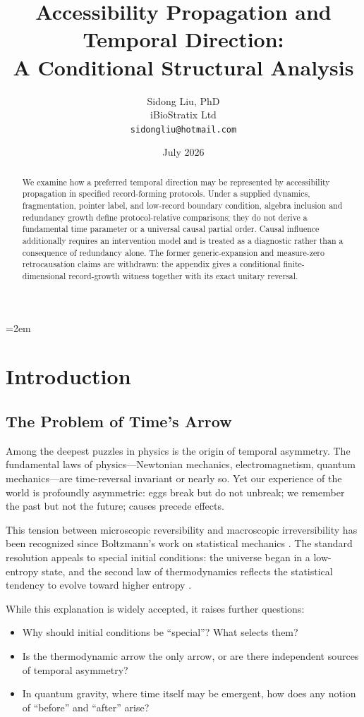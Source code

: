 \documentclass[12pt,a4paper]{article}
\title{Accessibility Propagation and Temporal Direction:\\
A Conditional Structural Analysis}
\author{
  Sidong Liu, PhD \\
  iBioStratix Ltd \\
  \texttt{sidongliu@hotmail.com}
}
\date{July 2026}
\begin{document}
\emergencystretch=2em
\raggedbottom
{}

\maketitle

\begin{abstract}
We examine how a preferred temporal direction may be represented by accessibility propagation in specified record-forming protocols. Under a supplied dynamics, fragmentation, pointer label, and low-record boundary condition, algebra inclusion and redundancy growth define protocol-relative comparisons; they do not derive a fundamental time parameter or a universal causal partial order. Causal influence additionally requires an intervention model and is treated as a diagnostic rather than a consequence of redundancy alone. The former generic-expansion and measure-zero retrocausation claims are withdrawn: the appendix gives a conditional finite-dimensional record-growth witness together with its exact unitary reversal.
\end{abstract}

\section{Introduction}
\label{sec:intro}

\subsection{The Problem of Time's Arrow}

Among the deepest puzzles in physics is the origin of temporal asymmetry. The fundamental laws of physics---Newtonian mechanics, electromagnetism, quantum mechanics---are time-reversal invariant or nearly so. Yet our experience of the world is profoundly asymmetric: eggs break but do not unbreak; we remember the past but not the future; causes precede effects.

This tension between microscopic reversibility and macroscopic irreversibility has been recognized since Boltzmann's work on statistical mechanics \cite{Boltzmann1896}. The standard resolution appeals to special initial conditions: the universe began in a low-entropy state, and the second law of thermodynamics reflects the statistical tendency to evolve toward higher entropy \cite{Penrose1989,Carroll2010}.

While this explanation is widely accepted, it raises further questions:
\begin{itemize}
    \item Why should initial conditions be ``special''? What selects them?
    \item Is the thermodynamic arrow the only arrow, or are there independent sources of temporal asymmetry?
    \item In quantum gravity, where time itself may be emergent, how does any notion of ``before'' and ``after'' arise?
\end{itemize}
\end{document}
